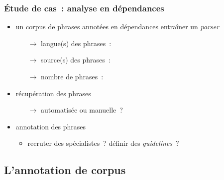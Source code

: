 \begin{frame}
\frametitle{Étude de cas~: analyse en dépendances}

\begin{itemize} \itemsep0.8em
    \item un corpus de phrases annotées en dépendances entraîner un 
          \textit{parser}
    \begin{itemize}
        \item[$\to$] langue(s) des phrases~: \underline{\qquad}
        \item[$\to$] source(s) des phrases~: \underline{\qquad}
        \item[$\to$] nombre de phrases~: \underline{\qquad}
    \end{itemize}
    \item récupération des phrases
    \begin{itemize}
        \item[$\to$] automatisée ou manuelle~?
    \end{itemize}
    \item annotation des phrases
    \begin{itemize}
        \item recruter des spécialistes~? définir des \textit{guidelines}~? 
    \end{itemize}

\end{itemize}

\end{frame}


\subsection{L'annotation de corpus}

